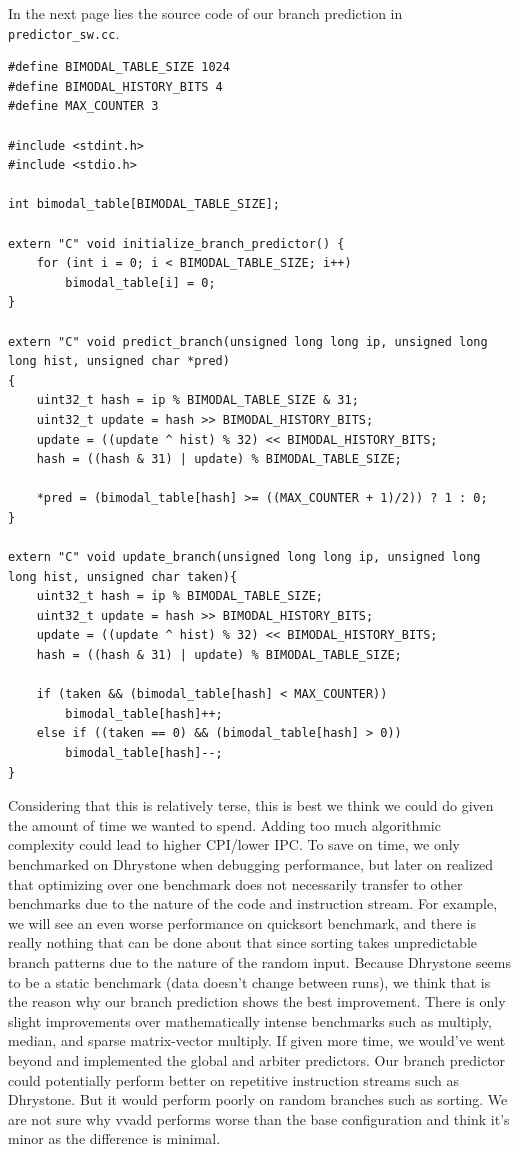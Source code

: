 \documentclass[11pt]{article}
\begin{document}
In the next page lies the source code of our branch prediction in \verb|predictor_sw.cc|.
\newpage
\lstset{language=c}
\begin{lstlisting}
#define BIMODAL_TABLE_SIZE 1024
#define BIMODAL_HISTORY_BITS 4
#define MAX_COUNTER 3

#include <stdint.h>
#include <stdio.h>

int bimodal_table[BIMODAL_TABLE_SIZE];

extern "C" void initialize_branch_predictor() {
    for (int i = 0; i < BIMODAL_TABLE_SIZE; i++)
        bimodal_table[i] = 0;
}

extern "C" void predict_branch(unsigned long long ip, unsigned long long hist, unsigned char *pred)
{
    uint32_t hash = ip % BIMODAL_TABLE_SIZE & 31;
    uint32_t update = hash >> BIMODAL_HISTORY_BITS;
    update = ((update ^ hist) % 32) << BIMODAL_HISTORY_BITS;
    hash = ((hash & 31) | update) % BIMODAL_TABLE_SIZE;

    *pred = (bimodal_table[hash] >= ((MAX_COUNTER + 1)/2)) ? 1 : 0;
}

extern "C" void update_branch(unsigned long long ip, unsigned long long hist, unsigned char taken){
    uint32_t hash = ip % BIMODAL_TABLE_SIZE;
    uint32_t update = hash >> BIMODAL_HISTORY_BITS;
    update = ((update ^ hist) % 32) << BIMODAL_HISTORY_BITS;
    hash = ((hash & 31) | update) % BIMODAL_TABLE_SIZE;

    if (taken && (bimodal_table[hash] < MAX_COUNTER))
        bimodal_table[hash]++;
    else if ((taken == 0) && (bimodal_table[hash] > 0))
        bimodal_table[hash]--;
}
\end{lstlisting}
\newpage

Considering that this is relatively terse, this is best we think we could do given the amount of time we wanted to spend. Adding too much algorithmic complexity could lead to higher CPI/lower IPC. To save on time, we only benchmarked on Dhrystone when debugging performance, but later on realized that optimizing over one benchmark does not necessarily transfer to other benchmarks due to the nature of the code and instruction stream. For example, we will see an even worse performance on quicksort benchmark, and there is really nothing that can be done about that since sorting takes unpredictable branch patterns due to the nature of the random input. Because Dhrystone seems to be a static benchmark (data doesn't change between runs), we think that is the reason why our branch prediction shows the best improvement. There is only slight improvements over mathematically intense benchmarks such as multiply, median, and sparse matrix-vector multiply. If given more time, we would've went beyond and implemented the global and arbiter predictors. Our branch predictor could potentially perform better on repetitive instruction streams such as Dhrystone. But it would perform poorly on random branches such as sorting. We are not sure why vvadd performs worse than the base configuration and think it's minor as the difference is minimal.
\end{document}
